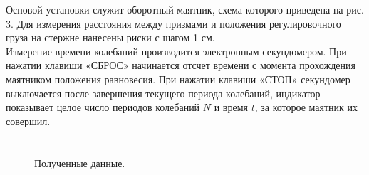 \documentclass[a4paper]{article}
\begin{document}
Основой установки служит оборотный маятник, схема которого приведена на рис. 3. Для измерения расстояния между призмами и положения регулировочного груза на стержне нанесены
риски с шагом 1 см.\\
Измерение времени колебаний производится электронным секундомером. При нажатии клавиши «СБРОС» начинается отсчет
времени с момента прохождения маятником положения равновесия. При нажатии клавиши «СТОП» секундомер выключается
после завершения текущего периода колебаний, индикатор показывает целое число периодов колебаний $N$ и время $t$, за которое
маятник их совершил.
\section{}
\begin{figure}[H]
\caption{Полученные данные.}
\end{figure}



\section{}
\end{document}
